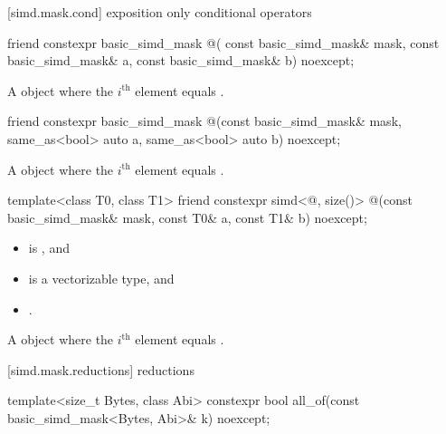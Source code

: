 [simd.mask.cond]{ exposition only conditional operators}

\begin{itemdecl}
friend constexpr basic_simd_mask @\simdselect@(
  const basic_simd_mask& mask, const basic_simd_mask& a, const basic_simd_mask& b) noexcept;
\end{itemdecl}

\begin{itemdescr}
  \pnum\returns
  A  object where the $i^\text{th}$ element equals  \foralli.
\end{itemdescr}

\begin{itemdecl}
friend constexpr basic_simd_mask
@\simdselect@(const basic_simd_mask& mask, same_as<bool> auto a, same_as<bool> auto b) noexcept;
\end{itemdecl}

\begin{itemdescr}
  \pnum\returns
  A  object where the $i^\text{th}$ element equals 
  \foralli.
\end{itemdescr}

\begin{itemdecl}
template<class T0, class T1>
  friend constexpr simd<@\seebelow@, size()>
    @\simdselect@(const basic_simd_mask& mask, const T0& a, const T1& b) noexcept;
\end{itemdecl}

\begin{itemdescr}
  \pnum\constraints
  \begin{itemize}
    \item {} is , and
    \item {} is a vectorizable type, and
    \item {}.
  \end{itemize}

  \pnum\returns
  A  object where the $i^\text{th}$ element equals  \foralli.
\end{itemdescr}

[simd.mask.reductions]{ reductions}

\begin{itemdecl}
template<size_t Bytes, class Abi>
  constexpr bool all_of(const basic_simd_mask<Bytes, Abi>& k) noexcept;
\end{itemdecl}

